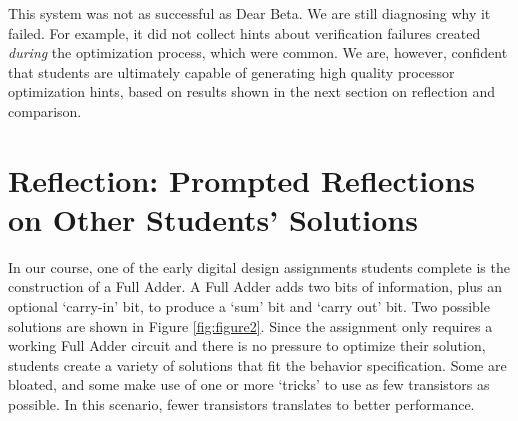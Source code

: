 \documentclass{sigchi}
\begin{document}
This system was not as successful as Dear Beta. We are still diagnosing why it failed. For example, it did not collect hints about verification failures created {\it during} the optimization process, which were common. We are, however, confident that students are ultimately capable of generating high quality processor optimization hints, based on results shown in the next section on reflection and comparison.

\section{Reflection: Prompted Reflections on Other Students' Solutions}

In our course, one of the early digital design assignments students complete is the construction of a Full Adder. A Full Adder adds two bits of information, plus an optional `carry-in' bit, to produce a `sum' bit and `carry out' bit. Two possible solutions are shown in Figure \ref{fig:figure2}. Since the assignment only requires a working Full Adder circuit and there is no pressure to optimize their solution, students create a variety of solutions that fit the behavior specification. Some are bloated, and some make use of one or more `tricks' to use as few transistors as possible. In this scenario, fewer transistors translates to better performance.
\end{document}
